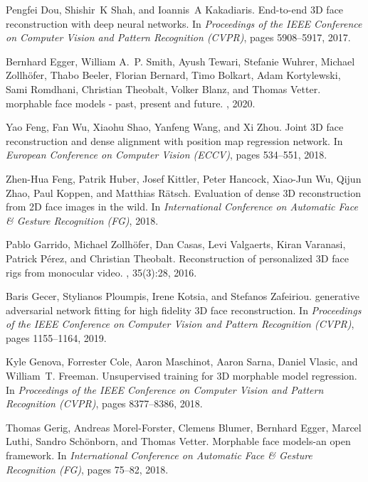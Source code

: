 \documentclass[final]{cvpr}
\begin{document}
{\begin{thebibliography}{10}
Pengfei Dou, Shishir~K Shah, and Ioannis~A Kakadiaris.
\newblock End-to-end {3D} face reconstruction with deep neural networks.
\newblock In {\em Proceedings of the IEEE Conference on Computer Vision and
  Pattern Recognition (CVPR)}, pages 5908--5917, 2017.

Bernhard Egger, William A.~P. Smith, Ayush Tewari, Stefanie Wuhrer, Michael
  Zollh{\"o}fer, Thabo Beeler, Florian Bernard, Timo Bolkart, Adam Kortylewski,
  Sami Romdhani, Christian Theobalt, Volker Blanz, and Thomas Vetter.
 morphable face models - past, present and future.
, 2020.

Yao Feng, Fan Wu, Xiaohu Shao, Yanfeng Wang, and Xi Zhou.
\newblock Joint {3D} face reconstruction and dense alignment with position map
  regression network.
\newblock In {\em European Conference on Computer Vision (ECCV)}, pages
  534--551, 2018.

Zhen-Hua Feng, Patrik Huber, Josef Kittler, Peter Hancock, Xiao-Jun Wu, Qijun
  Zhao, Paul Koppen, and Matthias R{\"a}tsch.
\newblock Evaluation of dense {3D} reconstruction from {2D} face images in the
  wild.
\newblock In {\em International Conference on Automatic Face \& Gesture
  Recognition (FG)}, 2018.

Pablo Garrido, Michael Zollh{\"o}fer, Dan Casas, Levi Valgaerts, Kiran
  Varanasi, Patrick P{\'e}rez, and Christian Theobalt.
\newblock Reconstruction of personalized {3D} face rigs from monocular video.
, 35(3):28, 2016.

Baris Gecer, Stylianos Ploumpis, Irene Kotsia, and Stefanos Zafeiriou.
 generative adversarial network fitting for high fidelity
  {3D} face reconstruction.
\newblock In {\em Proceedings of the IEEE Conference on Computer Vision and
  Pattern Recognition (CVPR)}, pages 1155--1164, 2019.

Kyle Genova, Forrester Cole, Aaron Maschinot, Aaron Sarna, Daniel Vlasic, and
  William~T. Freeman.
\newblock Unsupervised training for {3D} morphable model regression.
\newblock In {\em Proceedings of the IEEE Conference on Computer Vision and
  Pattern Recognition (CVPR)}, pages 8377--8386, 2018.

Thomas Gerig, Andreas Morel-Forster, Clemens Blumer, Bernhard Egger, Marcel
  Luthi, Sandro Sch{\"o}nborn, and Thomas Vetter.
\newblock Morphable face models-an open framework.
\newblock In {\em International Conference on Automatic Face \& Gesture
  Recognition (FG)}, pages 75--82, 2018.


\end{thebibliography}}
\end{document}
